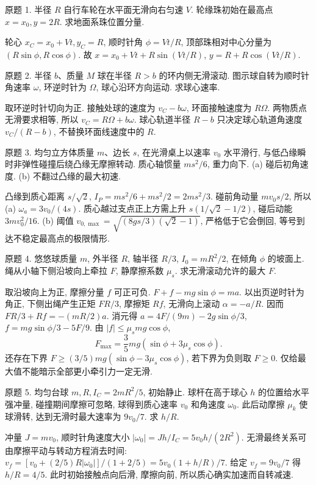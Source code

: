 \begin{exercise}
原题 1. 半径 $R$ 自行车轮在水平面无滑向右匀速 $V$. 轮缘珠初始在最高点 $x=x_0,y=2R$. 求地面系珠位置分量.
\end{exercise}
\begin{solution}
轮心 $x_C=x_0+Vt,y_C=R$, 顺时针角 $\phi=Vt/R$, 顶部珠相对中心分量为 $(R\sin\phi,R\cos\phi)$. 故 $x=x_0+Vt+R\sin(Vt/R)$, $y=R+R\cos(Vt/R)$.
\end{solution}
\begin{exercise}
原题 2. 半径 $b$、质量 $M$ 球在半径 $R>b$ 的环内侧无滑滚动. 图示球自转为顺时针角速率 $\omega$, 环逆时针为 $\Omega$, 球心沿环方向运动. 求球心速率.
\end{exercise}
\begin{solution}
取环逆时针切向为正. 接触处球的速度为 $v_C-b\omega$, 环面接触速度为 $R\Omega$. 两物质点无滑要求相等, 所以 $v_C=R\Omega+b\omega$. 球心轨道半径 $R-b$ 只决定球心轨道角速度 $v_C/(R-b)$, 不替换环面线速度中的 $R$.
\end{solution}
\begin{exercise}
原题 3. 均匀立方体质量 $m$、边长 $s$, 在光滑桌上以速率 $v_0$ 水平滑行, 与低凸缘瞬时非弹性碰撞后绕凸缘无摩擦转动. 质心轴惯量 $ms^2/6$, 重力向下. (a) 碰后初角速度. (b) 不翻过凸缘的最大初速.
\end{exercise}
\begin{solution}
凸缘到质心距离 $s/\sqrt2$, $I_P=ms^2/6+ms^2/2=2ms^2/3$. 碰前角动量 $mv_0s/2$, 所以 (a) $\omega_a=3v_0/(4s)$. 质心越过支点正上方需上升 $s(1/\sqrt2-1/2)$, 碰后动能 $3mv_0^2/16$. (b) 阈值 $v_{0,\max}=\sqrt{(8gs/3)(\sqrt2-1)}$, 严格低于它会倒回, 等号到达不稳定最高点的极限情形.
\end{solution}
\begin{exercise}
原题 4. 悠悠球质量 $m$, 外半径 $R$, 轴半径 $R/3$, $I_0=mR^2/2$, 在倾角 $\phi$ 的坡面上. 绳从小轴下侧沿坡向上牵拉 $F$, 静摩擦系数 $\mu_s$. 求无滑滚动允许的最大 $F$.
\end{exercise}
\begin{solution}
取沿坡向上为正, 摩擦分量 $f$ 可正可负. $F+f-mg\sin\phi=ma$. 以出页逆时针为角正, 下侧出绳产生正矩 $FR/3$, 摩擦矩 $Rf$, 无滑向上滚动 $\alpha=-a/R$. 因而 $FR/3+Rf=-(mR/2)a$. 消元得 $a=4F/(9m)-2g\sin\phi/3$, $f=mg\sin\phi/3-5F/9$. 由 $|f|\le\mu_smg\cos\phi$,
\begin{equation}
F_{\max}=\frac35mg(\sin\phi+3\mu_s\cos\phi).
\end{equation}
还存在下界 $F\ge(3/5)mg(\sin\phi-3\mu_s\cos\phi)$, 若下界为负则取 $F\ge0$. 仅给最大值不能暗示全部更小牵引力一定无滑.
\end{solution}
\begin{exercise}
原题 5. 均匀台球 $m,R,I_C=2mR^2/5$, 初始静止. 球杆在高于球心 $h$ 的位置给水平强冲量, 碰撞期间摩擦可忽略, 球得到质心速率 $v_0$ 和角速度 $\omega_0$. 此后动摩擦 $\mu_k$ 使球滑转, 达到无滑时最大速率为 $9v_0/7$. 求 $h/R$.
\end{exercise}
\begin{solution}
冲量 $J=mv_0$, 顺时针角速度大小 $|\omega_0|=Jh/I_C=5v_0h/(2R^2)$. 无滑最终关系可由摩擦平动与转动方程消去时间: $v_f=[v_0+(2/5)R|\omega_0|]/(1+2/5)=5v_0(1+h/R)/7$. 给定 $v_f=9v_0/7$ 得 $h/R=4/5$. 此时初始接触点向后滑, 摩擦向前, 所以质心确实加速而自转减速.
\end{solution}
